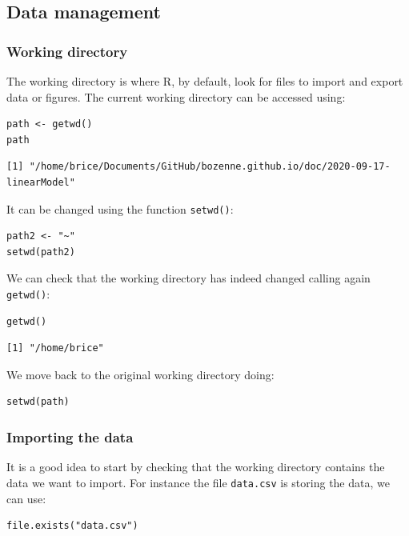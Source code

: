 \documentclass[12pt]{article}
\begin{document}
\clearpage


\subsection{Data management}
\label{sec:dataManagement}
\subsubsection{Working directory}
\label{sec:org3e83615}

The working directory is where R, by default, look for files
to import and export data or figures. The current working directory
can be accessed using:
\lstset{language=r,label= ,caption= ,captionpos=b,numbers=none}
\begin{lstlisting}
path <- getwd()
path
\end{lstlisting}

\begin{verbatim}
[1] "/home/brice/Documents/GitHub/bozenne.github.io/doc/2020-09-17-linearModel"
\end{verbatim}

It can be changed using the function \texttt{setwd()}:
\lstset{language=r,label= ,caption= ,captionpos=b,numbers=none}
\begin{lstlisting}
path2 <- "~"
setwd(path2)
\end{lstlisting}

We can check that the working directory has indeed changed calling
again \texttt{getwd()}:
\lstset{language=r,label= ,caption= ,captionpos=b,numbers=none}
\begin{lstlisting}
getwd()
\end{lstlisting}

\begin{verbatim}
[1] "/home/brice"
\end{verbatim}

We move back to the original working directory doing:
\lstset{language=r,label= ,caption= ,captionpos=b,numbers=none}
\begin{lstlisting}
setwd(path)
\end{lstlisting}

\subsubsection{Importing the data}
\label{sec:org1c85bb4}

It is a good idea to start by checking that the working directory
contains the data we want to import. For instance the file \texttt{data.csv}
is storing the data, we can use:
\lstset{language=r,label= ,caption= ,captionpos=b,numbers=none}
\begin{lstlisting}
file.exists("data.csv")
\end{lstlisting}
\end{document}
